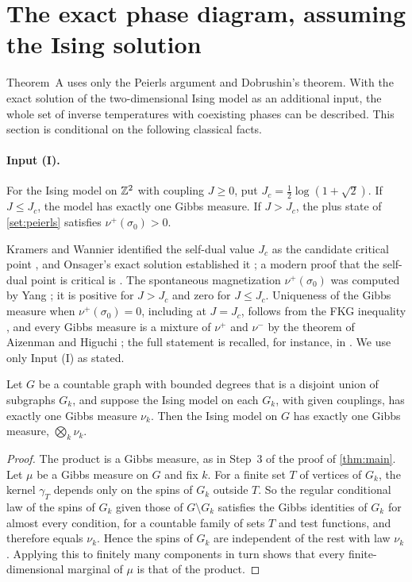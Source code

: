 \section{The exact phase diagram, assuming the Ising solution}\label{sec:exact}

Theorem~A uses only the Peierls argument and Dobrushin's theorem. With the exact solution of the two-dimensional Ising model as an additional input, the whole set of inverse temperatures with coexisting phases can be described. This section is conditional on the following classical facts.

\paragraph{Input (I).} For the Ising model on $\mathbb{Z}^2$ with coupling $J\ge0$, put $J_c=\frac12\log(1+\sqrt2)$. If $J\le J_c$, the model has exactly one Gibbs measure. If $J>J_c$, the plus state of \cref{set:peierls} satisfies $\nu^+(\sigma_0)>0$.

Kramers and Wannier identified the self-dual value $J_c$ as the candidate critical point \cite{KramersWannier41}, and Onsager's exact solution established it \cite{Onsager44}; a modern proof that the self-dual point is critical is \cite{BeffaraDuminilCopin12}. The spontaneous magnetization $\nu^+(\sigma_0)$ was computed by Yang \cite{Yang52}; it is positive for $J>J_c$ and zero for $J\le J_c$. Uniqueness of the Gibbs measure when $\nu^+(\sigma_0)=0$, including at $J=J_c$, follows from the FKG inequality \cite[Chapters~3 and~6]{FriedliVelenik17}, and every Gibbs measure is a mixture of $\nu^+$ and $\nu^-$ by the theorem of Aizenman and Higuchi \cite{Aizenman80,Higuchi81}; the full statement is recalled, for instance, in \cite[Section~1]{CoquilleVelenik12}. We use only Input (I) as stated.

\begin{lemma}\label{ex:product}
Let $G$ be a countable graph with bounded degrees that is a disjoint union of subgraphs $G_k$, and suppose the Ising model on each $G_k$, with given couplings, has exactly one Gibbs measure $\nu_k$. Then the Ising model on $G$ has exactly one Gibbs measure, $\bigotimes_k\nu_k$.
\end{lemma}

\begin{proof}
The product is a Gibbs measure, as in Step~3 of the proof of \cref{thm:main}. Let $\mu$ be a Gibbs measure on $G$ and fix $k$. For a finite set $T$ of vertices of $G_k$, the kernel $\gamma_T$ depends only on the spins of $G_k$ outside $T$. So the regular conditional law of the spins of $G_k$ given those of $G\setminus G_k$ satisfies the Gibbs identities of $G_k$ for almost every condition, for a countable family of sets $T$ and test functions, and therefore equals $\nu_k$. Hence the spins of $G_k$ are independent of the rest with law $\nu_k$. Applying this to finitely many components in turn shows that every finite-dimensional marginal of $\mu$ is that of the product.
\end{proof}

